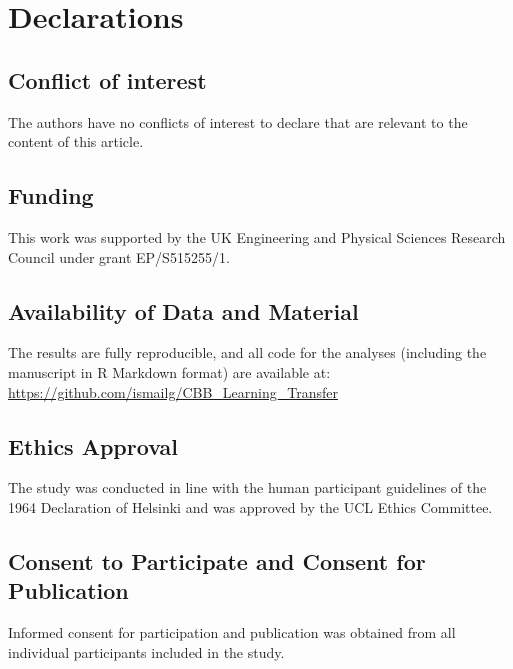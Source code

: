 \documentclass[smallextended]{svjour3}       %
\begin{document}
\hypertarget{declarations}{%
\section{Declarations}\label{declarations}}

\hypertarget{conflict-of-interest}{%
\subsection{Conflict of interest}\label{conflict-of-interest}}

The authors have no conflicts of interest to declare that are relevant
to the content of this article.

\hypertarget{funding}{%
\subsection{Funding}\label{funding}}

This work was supported by the UK Engineering and Physical Sciences
Research Council under grant EP/S515255/1.

\hypertarget{availability-of-data-and-material}{%
\subsection{Availability of Data and
Material}\label{availability-of-data-and-material}}

The results are fully reproducible, and all code for the analyses
(including the manuscript in R Markdown format) are available at:
\url{https://github.com/ismailg/CBB_Learning_Transfer}

\hypertarget{ethics-approval}{%
\subsection{Ethics Approval}\label{ethics-approval}}

The study was conducted in line with the human participant guidelines of
the 1964 Declaration of Helsinki and was approved by the UCL Ethics
Committee.

\hypertarget{consent-to-participate-and-consent-for-publication}{%
\subsection{Consent to Participate and Consent for
Publication}\label{consent-to-participate-and-consent-for-publication}}

Informed consent for participation and publication was obtained from all
individual participants included in the study.
\end{document}
